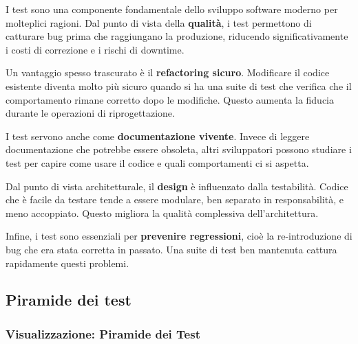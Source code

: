 I test sono una componente fondamentale dello sviluppo software moderno per molteplici ragioni. Dal punto di vista della \textbf{qualità}, i test permettono di catturare bug prima che raggiungano la produzione, riducendo significativamente i costi di correzione e i rischi di downtime.

Un vantaggio spesso trascurato è il \textbf{refactoring sicuro}. Modificare il codice esistente diventa molto più sicuro quando si ha una suite di test che verifica che il comportamento rimane corretto dopo le modifiche. Questo aumenta la fiducia durante le operazioni di riprogettazione.

I test servono anche come \textbf{documentazione vivente}. Invece di leggere documentazione che potrebbe essere obsoleta, altri sviluppatori possono studiare i test per capire come usare il codice e quali comportamenti ci si aspetta.

Dal punto di vista architetturale, il \textbf{design} è influenzato dalla testabilità. Codice che è facile da testare tende a essere modulare, ben separato in responsabilità, e meno accoppiato. Questo migliora la qualità complessiva dell'architettura.

Infine, i test sono essenziali per \textbf{prevenire regressioni}, cioè la re-introduzione di bug che era stata corretta in passato. Una suite di test ben mantenuta cattura rapidamente questi problemi.

\subsection{Piramide dei test}

\subsubsection{Visualizzazione: Piramide dei Test}

